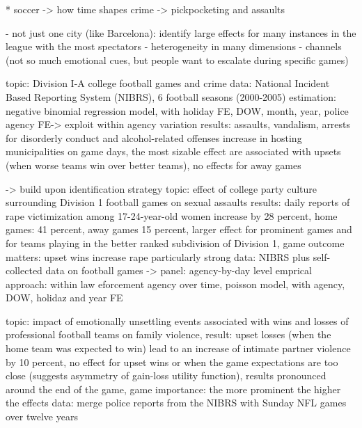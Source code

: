 \documentclass[11pt, a4paper]{article} %
\begin{document}
	* soccer
		-> how time shapes crime \cite{montolio2016time}
		-> pickpocketing and assaults \cite{montolio2019measuring}
	
	
	
- not just one city (like Barcelona): identify large effects for many instances in the league with the most spectators
- heterogeneity in many dimensions
- channels (not so much emotional cues, but people want to escalate during specific games)





\cite{rees2009college}
topic: Division I-A college football games and crime
data: National Incident Based Reporting System (NIBRS), 6 football seasons (2000-2005)
estimation: negative binomial regression model, with holiday FE, DOW, month, year, police agency FE-> exploit within agency variation
results: assaults, vandalism, arrests for disorderly conduct and alcohol-related offenses increase in hosting municipalities on game days, the most sizable effect are associated with upsets (when worse teams win over better teams), no effects for away games


\cite{lindo2018college} -> build upon identification strategy
topic: effect of college party culture surrounding Division 1 football games on sexual assaults
results: daily reports of rape victimization among 17-24-year-old women increase by 28 percent, home games: 41 percent, away games 15 percent, larger effect for prominent games and for teams playing in the better ranked subdivision of Division 1, game outcome matters: upset wins increase rape particularly strong
data: NIBRS plus self-collected data on football games -> panel: agency-by-day level
emprical approach: within law eforcement agency over time, poisson model, with agency, DOW, holidaz and year FE


\cite{card2011family}
topic: impact of emotionally unsettling events associated with wins and losses of professional football teams on family violence, 
result: upset losses (when the home team was expected to win) lead to an increase of intimate partner violence by 10 percent, no effect for upset wins or when the game expectations are too close (suggests asymmetry of gain-loss utility function), results pronounced around the end of the game, game importance: the more prominent the higher the effects
data: merge police reports from the NIBRS with Sunday NFL games over twelve years
\end{document}
